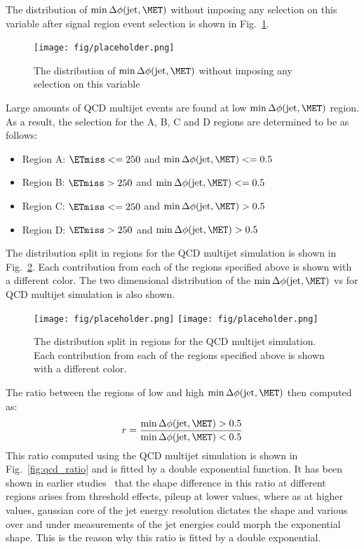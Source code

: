 The distribution of $\min\Delta\phi({\rm jet,\MET})$ without imposing any selection on this variable 
after signal region event selection is shown in Fig.~\ref{fig:qcd_variables}. 

\begin{figure}[htb]
  \begin{center}
    \texttt{[image: fig/placeholder.png]}
  \end{center}
  \caption{The distribution of $\min\Delta\phi({\rm jet,\MET})$ without imposing any selection on this variable}
\label{fig:qcd_variables}
\end{figure}

Large amounts of QCD multijet events are found at low $\min\Delta\phi({\rm jet,\MET})$ 
region. As a result, the selection for the A, B, C and D regions are determined to be as follows:
\begin{itemize}
\item Region A: $\ETmiss <=250$ and $\min\Delta\phi({\rm jet,\MET})<=0.5$
\item Region B: $\ETmiss > 250$ and $\min\Delta\phi({\rm jet,\MET})<=0.5$
\item Region C: $\ETmiss <=250$ and $\min\Delta\phi({\rm jet,\MET})>0.5$ 
\item Region D: $\ETmiss > 250$ and $\min\Delta\phi({\rm jet,\MET})>0.5$
\end{itemize}

The \ETmiss distribution split in regions for the QCD multijet simulation 
is shown in Fig.~\ref{fig:qcd_variables_sections}. Each contribution
from each of the regions specified above is shown with a different color. 
The two dimensional distribution of the $\min\Delta\phi({\rm jet,\MET})$ 
vs \ETmiss for QCD multijet simulation is also shown. 

\begin{figure}[h]
  \begin{center}
    \texttt{[image: fig/placeholder.png]}
    \texttt{[image: fig/placeholder.png]}
  \end{center}
  \caption{The \ETmiss distribution split in regions for the QCD multijet simulation. Each contribution
from each of the regions specified above is shown with a different color. }
\label{fig:qcd_variables_sections}
\end{figure}

The ratio between the regions of low and high $\min\Delta\phi({\rm jet,\MET})$ then computed as:
\[
r = \frac{\min\Delta\phi({\rm jet,\MET})>0.5}{\min\Delta\phi({\rm jet,\MET})<0.5}
\]
This ratio computed using the QCD multijet simulation is shown in Fig.~\ref{fig:qcd_ratio} and is fitted by a double exponential 
function. It has been shown in earlier studies~\cite{AN-10-204} 
that the shape difference in this ratio at different \ETmiss regions arises from threshold effects, pileup at lower \ETmiss values, 
where as at higher values, gaussian core of the jet energy resolution dictates the shape and various over and under 
measurements of the jet energies could morph the exponential shape. This is the reason why this ratio is fitted by a double exponential. 

